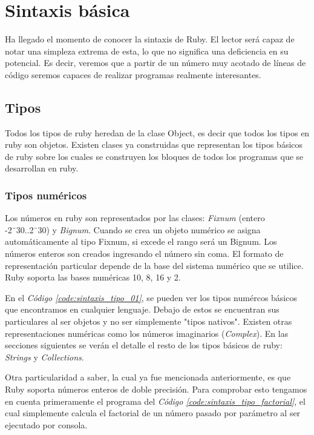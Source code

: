 \documentclass{article}
\newcommand{\refcode}[1]{\textit{Código \ref{#1}}}
\begin{document}
\section{Sintaxis básica}

	Ha llegado el momento de conocer la sintaxis de Ruby. El lector será capaz de notar una simpleza extrema de esta, lo que no significa una deficiencia en su potencial. Es decir, veremos que a partir de un número muy acotado de líneas de código seremos capaces de realizar programas realmente interesantes.
\bigskip



\subsection{Tipos}
Todos los tipos de ruby heredan de la clase Object, es decir que todos los tipos en ruby son objetos. Existen clases ya construidas que representan los tipos básicos de ruby sobre los cuales se construyen los bloques de todos los programas que se desarrollan en ruby.
\bigskip



\subsubsection{Tipos numéricos}
Los números en ruby son representados por las clases: \textit{Fixnum} (entero  -2¨30..2¨30) y \textit{Bignum}.
Cuando se crea un objeto numérico se asigna automáticamente al tipo Fixnum, si excede el rango será un Bignum.
Los números enteros son creados ingresando el número sin coma. El formato de representación particular depende de la base del sistema numérico que se utilice. Ruby soporta las bases numéricas 10, 8, 16 y 2.

 
\bigskip\bigskip

	En el \refcode{code:sintaxis_tipo_01}, se pueden ver los tipos numércos básicos que encontramos en cualquier lenguaje. Debajo de estos se encuentran sus particulares al ser objetos y no ser simplemente "tipos nativos". Existen otras representaciones numéricas como los números imaginarios (\textit{Complex}). En las secciones siguientes se verán el detalle el resto de los tipos básicos de ruby: \textit{Strings} y \textit{Collections}.
	\par
	Otra particularidad a saber, la cual ya fue mencionada anteriormente, es que Ruby soporta números enteros de doble precisión. Para comprobar esto tengamos en cuenta primeramente el programa del \refcode{code:sintaxis_tipo_factorial}, el cual simplemente calcula el factorial de un número pasado por parámetro al ser ejecutado por consola.
\end{document}
